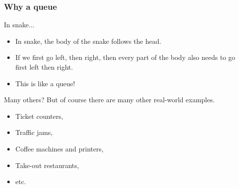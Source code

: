\begin{frame}
	\frametitle{Why a queue}
		\begin{block}{In snake...}
			\begin{itemize}
				\item In snake, the body of the snake follows the head.
					\pause
				\item If we first go left, then right, then every part of the body also needs to go first left then right.
					\pause
				\item This is like a queue!
			\end{itemize}
		\end{block}	
		\pause
			\begin{exampleblock}{Many others?}
				But of course there are many other real-world examples.
				\begin{itemize}
					\item Ticket counters,
					\item Traffic jams,
					\item Coffee machines and printers,
					\item Take-out restaurants,
					\item etc.
				\end{itemize}
			\end{exampleblock}	
\end{frame}


